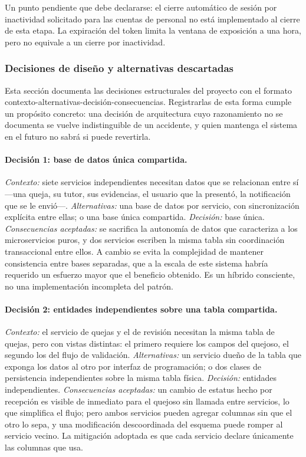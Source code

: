 	Un punto pendiente que debe declararse: el cierre automático de sesión por inactividad
	solicitado para las cuentas de personal no está implementado al cierre de esta etapa. La
	expiración del token limita la ventana de exposición a una hora, pero no equivale a un cierre
	por inactividad.
	
	\subsubsection{Decisiones de diseño y alternativas descartadas}
	\label{sec:decisiones_diseno}
	Esta sección documenta las decisiones estructurales del proyecto con el formato
	contexto-alternativas-decisión-consecuencias. Registrarlas de esta forma cumple un propósito
	concreto: una decisión de arquitectura cuyo razonamiento no se documenta se vuelve
	indistinguible de un accidente, y quien mantenga el sistema en el futuro no sabrá si puede
	revertirla.
	
	\paragraph{Decisión 1: base de datos única compartida.}
	\emph{Contexto:} siete servicios independientes necesitan datos que se relacionan entre sí ---una
	queja, su tutor, sus evidencias, el usuario que la presentó, la notificación que se le envió---.
	\emph{Alternativas:} una base de datos por servicio, con sincronización explícita entre ellas;
	o una base única compartida. \emph{Decisión:} base única. \emph{Consecuencias aceptadas:} se
	sacrifica la autonomía de datos que caracteriza a los microservicios puros, y dos servicios
	escriben la misma tabla sin coordinación transaccional entre ellos. A cambio se evita la
	complejidad de mantener consistencia entre bases separadas, que a la escala de este sistema
	habría requerido un esfuerzo mayor que el beneficio obtenido. Es un híbrido consciente, no una
	implementación incompleta del patrón.
	
	\paragraph{Decisión 2: entidades independientes sobre una tabla compartida.}
	\emph{Contexto:} el servicio de quejas y el de revisión necesitan la misma tabla de quejas, pero
	con vistas distintas: el primero requiere los campos del quejoso, el segundo los del flujo de
	validación. \emph{Alternativas:} un servicio dueño de la tabla que exponga los datos al otro por
	interfaz de programación; o dos clases de persistencia independientes sobre la misma tabla
	física. \emph{Decisión:} entidades independientes. \emph{Consecuencias aceptadas:} un cambio de
	estatus hecho por recepción es visible de inmediato para el quejoso sin llamada entre servicios,
	lo que simplifica el flujo; pero ambos servicios pueden agregar columnas sin que el otro lo
	sepa, y una modificación descoordinada del esquema puede romper al servicio vecino. La mitigación
	adoptada es que cada servicio declare únicamente las columnas que usa.
	
